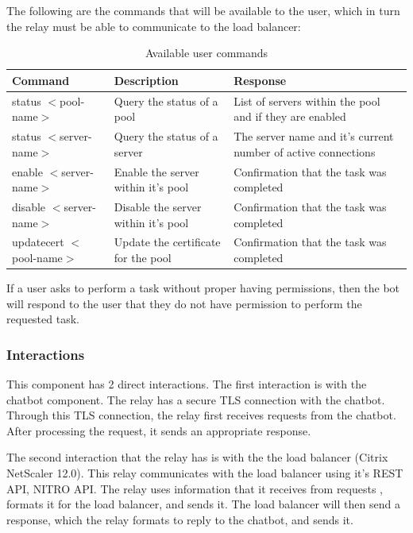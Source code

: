 \documentclass[onecolumn, draftclsnofoot,10pt, compsoc]{IEEEtran}
\begin{document}
The following are the commands that will be available to the user, which in turn the relay must be able to communicate to the load balancer:

\begin{table}[h]
    \caption{Available user commands}
    \begin{tabular}{ p{1.5in} p{2.5in} p{2.5in}  }
     \textbf{Command} & \textbf{Description} & \textbf{Response} \\
     \hline
     status $<$pool-name$>$
     & Query the status of a pool
     & List of servers within the pool and if they are enabled \\
     \hline
     status $<$server-name$>$
     & Query the status of a server
     & The server name and it's current number of active connections \\
     \hline
     enable $<$server-name$>$
     & Enable the server within it's pool
     & Confirmation that the task was completed \\
     \hline
     disable $<$server-name$>$
     & Disable the server within it's pool
     & Confirmation that the task was completed \\
     \hline
     updatecert $<$pool-name$>$
     & Update the certificate for the pool
     & Confirmation that the task was completed \\
     \hline
    \end{tabular}
    \label{tab:commands}
\end{table}

If a user asks to perform a task without proper having permissions, then the bot will respond to the user that they do not have permission to perform the requested task.

\subsubsection{Interactions}
This component has 2 direct interactions.
The first interaction is with the chatbot component.
The relay has a secure TLS connection with the chatbot.
Through this TLS connection, the relay first receives requests from the chatbot.
After processing the request, it sends an appropriate response.

The second interaction that the relay has is with the the load balancer (Citrix NetScaler 12.0).
This relay communicates with the load balancer using it's REST API, NITRO API.
The relay uses information that it receives from requests , formats it for the load balancer, and sends it.
The load balancer will then send a response, which the relay formats to reply to the chatbot, and sends it.
\end{document}
